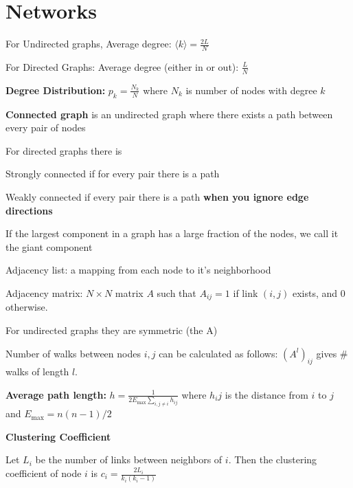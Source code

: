 \section*{Networks}

For Undirected graphs, Average degree: $\langle k \rangle = \frac{2L}{N}$

For Directed Graphs: Average degree (either in or out): $\frac{L}{N}$

\textbf{Degree Distribution:} $p_k = \frac{N_k}{N}$ where $N_k$ is number of 
nodes with degree $k$

\textbf{Connected graph} is an undirected graph where there exists a path between 
every pair of nodes

For directed graphs there is 
\begin{tightitemize}
    \item Strongly connected if for every pair there is a path 
    \item Weakly connected if every pair there is a path \textbf{when you
    ignore edge directions}
\end{tightitemize}

If the largest component in a graph has a large fraction of the nodes,
we call it the giant component

\begin{tightitemize}
    \item Adjacency list: a mapping from each node to it's neighborhood
    \item Adjacency matrix: $N \times N$ matrix $A$ such that $A_{ij} = 1$ if link 
    $(i, j)$ exists, and $0$ otherwise. 
\end{tightitemize}

\begin{tightitemize}
    \item For undirected graphs they are symmetric (the A)
    \item Number of walks between nodes $i, j$ can be calculated as follows:
        $(A^l)_{ij}$ gives $\#$walks of length $l$.
\end{tightitemize}

\textbf{Average path length:}
$
h = \frac{1}{2E_{\text{max}} \sum_{i, j \ne i}h_{ij}}
$
where $h_ij$ is the distance from $i$ to $j$ and $E_{\text{max}} = n(n-1)/2$

\textbf{Clustering Coefficient}

Let $L_i$  be the number of links between neighbors of $i$. 
Then the clustering coefficient of node $i$ is 
$
c_i = \frac{2L_i}{k_i(k_i - 1)}
$

